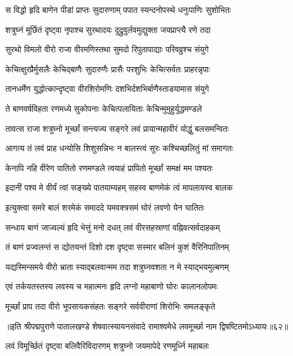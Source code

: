 \twolineshloka
{स विद्धो हृदि बाणेन पीडां प्राप्तः सुदारुणाम्}
{पपात स्यन्दनोपस्थे धनुःपाणिः सुशोभितः}%

\twolineshloka
{शत्रुघ्नं मूर्छितं दृष्ट्वा नृपाश्च सुरथादयः}
{दुद्रुवुर्लवमुद्युक्ता जयप्राप्त्यै रणे तदा}%

\twolineshloka
{सुरथो विमलो वीरो राजा वीरमणिस्तथा}
{सुमदो रिपुतापाद्याः परिवव्रुश्च संयुगे}%

\twolineshloka
{केचित्क्षुरप्रैर्मुसलैः केचिद्बाणैः सुदारुणैः}
{प्रासैः परशुभिः केचित्सर्वतः प्राहरन्नृपाः}%

\twolineshloka
{तानधर्मेण युद्धोत्कान्दृष्ट्वा वीरशिरोमणिः}
{दशभिर्दशभिर्बाणैस्ताडयामास संयुगे}%

\twolineshloka
{ते बाणवर्षविहता रणमध्ये सुकोपनाः}
{केचित्पलायिताः केचिन्मुमुहुर्युद्धमण्डले}%

\twolineshloka
{तावत्स राजा शत्रुघ्नो मूर्च्छां सन्त्यज्य सङ्गरे}
{लवं प्रायान्महावीरं योद्धुं बलसमन्वितः}%

\twolineshloka
{आगत्य तं लवं प्राह धन्योसि शिशुसन्निभः}
{न बालस्त्वं सुरः कश्चिच्छलितुं मां समागतः}%

\twolineshloka
{केनापि नहि वीरेण पातितो रणमण्डले}
{त्वयाहं प्रापितो मूर्च्छां समक्षं मम पश्यतः}%

\twolineshloka
{इदानीं पश्य मे वीर्यं त्वां सङ्ख्ये पातयाम्यहम्}
{सहस्व बाणमेकं त्वं मापलायस्व बालक}%

\twolineshloka
{इत्युक्त्वा समरे बालं शरमेकं समाददे}
{यमवक्त्रसमं घोरं लवणो येन घातितः}%

\twolineshloka
{सन्धाय बाणं जाज्वल्यं हृदि भेत्तुं मनो दधत्}
{लवं वीरसहस्राणां वह्निवत्सर्वदाहकम्}%

\twolineshloka
{तं बाणं प्रज्वलन्तं स द्योतयन्तं दिशो दश}
{दृष्ट्वा सस्मार बलिनं कुशं वैरिनिपातिनम्}%

\twolineshloka
{यद्यस्मिन्समये वीरो भ्राता स्याद्बलवान्मम}
{तदा शत्रुघ्नवशता न मे स्याद्भयमुल्बणम्}%

\twolineshloka
{एवं तर्कयतस्तस्य लवस्य च महात्मनः}
{हृदि लग्नो महाबाणो घोरः कालानलोपमः}%

\twolineshloka
{मूर्च्छां प्राप तदा वीरो भूपसायकसंहतः}
{सङ्गरे सर्ववीराणां शिरोभिः समलङ्कृते}%

॥इति श्रीपद्मपुराणे पातालखण्डे शेषवात्स्यायनसंवादे रामाश्वमेधे लवमूर्च्छा नाम द्विषष्टितमोऽध्यायः॥६२॥



\twolineshloka
{लवं विमूर्च्छितं दृष्ट्वा बलिवैरिविदारणम्}
{शत्रुघ्नो जयमापेदे रणमूर्ध्नि महाबलः}%


